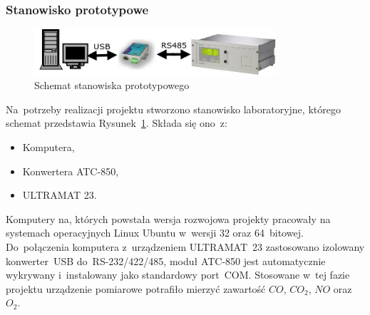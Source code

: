 \subsubsection{Stanowisko prototypowe}
\begin{figure}[!htb] 	\centering 	\includegraphics[width=0.8\textwidth]{images/schemat1} 	\caption{Schemat stanowiska prototypowego} \label{schemat1} \end{figure} 
Na~potrzeby realizacji projektu stworzono stanowisko laboratoryjne, którego schemat przedstawia Rysunek~\ref{schemat1}. Składa się ono~z:
\begin{itemize}
\item Komputera,
\item Konwertera ATC-850,
\item ULTRAMAT 23.
\end{itemize}
\indent
\indent Komputery na, których powstała wersja rozwojowa projekty pracowały na systemach operacyjnych Linux Ubuntu w~wersji 32 oraz 64~bitowej. Do~połączenia komputera z~urządzeniem ULTRAMAT~23 zastosowano izolowany konwerter~USB do~RS-232/422/485, moduł ATC-850 jest automatycznie wykrywany i~instalowany jako standardowy port~COM. Stosowane w~tej fazie projektu urządzenie pomiarowe potrafiło mierzyć zawartość $ CO $, $ CO_2 $, $ NO $ oraz $ O_2 $.

